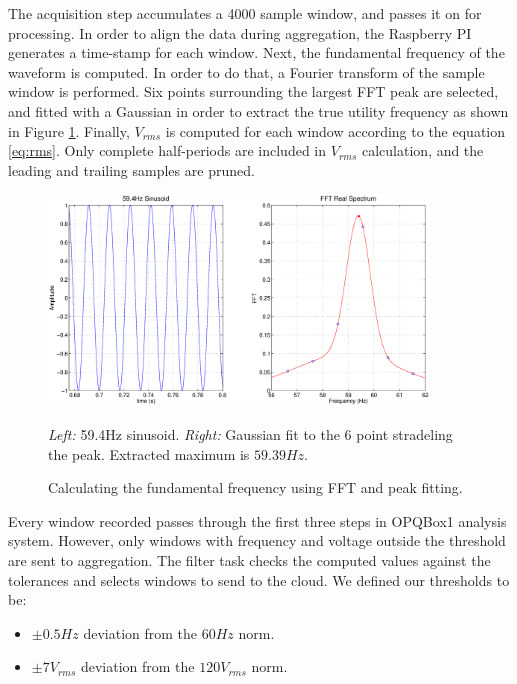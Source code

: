 The acquisition step accumulates a 4000 sample window, and passes it on for processing. In order to align the data during aggregation, the Raspberry PI generates a time-stamp for each window. Next, the fundamental frequency of the waveform is computed. In order to do that, a Fourier transform of the sample window is performed. Six points surrounding the largest FFT peak are selected, and fitted with a Gaussian in order to extract the true utility frequency as shown in Figure \ref{fig:fit}. Finally,  $V_{rms}$ is computed for each window according to the equation \ref{eq:rms}.  Only complete half-periods are included in $V_{rms}$ calculation, and the leading and trailing samples are pruned. 

\begin{figure}[h!]
\begin{center}
\label{fig:fit}
\includegraphics[width=0.9\textwidth]{img/fftFit.eps}
\end{center}
\caption{Calculating the fundamental frequency using FFT and peak fitting.}
\begin{center}
\textit{Left:} 59.4Hz sinusoid. \textit{Right:} Gaussian fit to the 6 point stradeling the peak. Extracted maximum is $59.39Hz$.
\end{center}
\end{figure}


Every window recorded passes through the first three steps in OPQBox1 analysis system. However, only windows with frequency and voltage outside the threshold are sent to aggregation.  The filter task checks the computed values against the tolerances and selects windows to send to the cloud. We defined our thresholds to be:

\begin{itemize}
\item $\pm 0.5Hz$ deviation from the $60Hz$ norm.
\item $\pm 7V_{rms}$ deviation from the $120V_{rms}$ norm.
\end{itemize}

